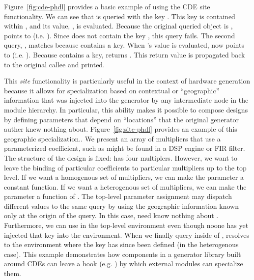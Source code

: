 Figure~\ref{fig:cde-phdl} provides a basic example of using the CDE site functionality.
We can see that  is queried with the key . 
This key is contained within , and its value, , is evaluated. 
Because the original queried object is ,  points to  (i.e. ). 
Since  does not contain the key , this query fails.
The second query, , matches because  contains a  key. 
When 's value is evaluated,  now points to  (i.e. ). 
Because  contains a  key,  returns . 
This return value is propagated back to the original  callee and printed.

This \emph{site} functionality is particularly useful in the context of hardware generation because 
it allows for specialization based on contextual or ``geographic'' information that was injected into the generator by any intermediate node in the module hierarchy.
In particular, this ability makes it possible to compose designs by defining parameters that depend on ``locations'' that the original generator auther knew nothing about.
Figure~\ref{fig:site-phdl} provides an example of this geographic specialization..
We present an array of multipliers that use a parameterized coefficient, such as might be found in a DSP engine or FIR filter.
The structure of the design is fixed:  has four multiplers.
However, we want to leave the binding of particular coefficients to particular multipliers up to the top level.
If we want a homogenous set of multipliers, we can make the  parameter a constant function.
If we want a heterogenous set of multipliers, we can make the  parameter a function of .
The top-level parameter assignment may dispatch different values to the same query by using the geographic information known only at the origin of the query. 
In this case,  need know nothing about .
Furthermore, we can use  in the top-level environment even though noone has yet injected that key into the environment.
When we finally query  inside of ,  resolves to the environment where the  key has since been defined (in the heterogenous case).
This example demonstrates how components in a generator library built around CDEs can leave a hook (e.g. ) by which external modules can specialize them.

